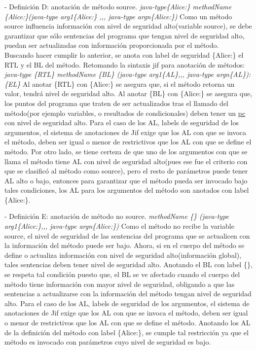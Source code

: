 - Definición D: anotación de método source.\newline 
\emph{java-type\{Alice:\}  methodName \{Alice:\}(java-type arg1\{Alice:\} ,,,
java-type argn\{Alice:\})}
Como un método source influencia información con nivel de seguridad alto(variable
source), se debe garantizar que sólo sentencias del programa que tengan nivel de
seguridad alto, puedan ser actualizadas con información proporcionada por el método.\\
Buscando hacer cumplir lo anterior, se anota con label de
seguridad \{Alice:\} el RTL y el BL del método.
Retomando la sintaxis jif para anotación de métodos:\newline 
\emph{java-type \{RTL\} methodName \{BL\} (java-type arg1\{AL\},,, java-type argn\{AL\}):\{EL\} }\newline
Al anotar \{RTL\} con \{Alice:\} se asegura que, si el método retorna un valor,
tendrá nivel de seguridad alto.\newline
Al anotar \{BL\} con \{Alice:\} se asegura que, los puntos del programa que
traten de ser actualizados tras el llamado del método(por ejemplo variables, o
resultados de condicionales) deben tener un \underline{pc} con nivel de
seguridad alto.\newline
Para el caso de los AL, labels de seguridad de los argumentos, el sistema de
anotaciones de Jif exige que los AL con que se invoca el método, deben ser igual
o menor de restrictivos que los AL con que se define el método. 
Por otro lado, se tiene certeza de que uno de los argumentos con que se llama el
método tiene AL con nivel de seguridad alto(pues ese fue el criterio con que
se clasificó al método como source), pero el resto de parámetros puede tener AL
alto o bajo, entonces para garantizar que el método pueda ser invocado bajo
tales condiciones, los AL para los argumentos del método son anotados con
label \{Alice:\}.

- Definición E: anotación de método no source.\newline
\emph{methodName \{\} (java-type arg1\{Alice:\},,, java-type argn\{Alice:\})}\newline
Como el método no recibe la variable source, el nivel de seguridad de las
sentencias del programa que se actualicen con la información del método puede
ser bajo. Ahora,  si en el cuerpo del método se define o actualiza información
con nivel de seguridad alto(información global), tales sentencias deben tener
nivel de seguridad alto.
Anotando el BL con label {\{\}}, se respeta tal condición puesto que,
el BL se ve afectado cuando el cuerpo del método tiene información con mayor
nivel de seguridad, obligando a que las sentencias a actualizarse con la
información del método tengan nivel de seguridad alto.\newline
Para el caso de los AL, labels de seguridad de los argumentos, el sistema de
anotaciones de Jif exige que los AL con que se invoca el método, deben ser igual
o menor de restrictivos que los AL con que se define el método. Anotando los AL
de la definición del método con label \{Alice:\}, se cumple tal restricción ya
que el método es invocado con parámetros cuyo nivel de seguridad es bajo.

